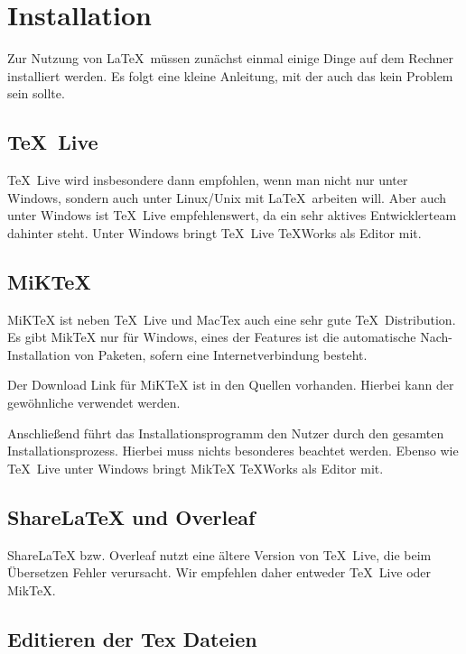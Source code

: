 
\chapter{Installation}\label{ch:installation}

Zur Nutzung von \LaTeX\ müssen zunächst einmal einige Dinge auf dem Rechner installiert werden. 
Es folgt eine kleine Anleitung, mit der auch das kein Problem sein sollte.

\section{\TeX\ Live}

\TeX\ Live wird insbesondere dann empfohlen, wenn man nicht nur unter Windows, sondern auch unter Linux/Unix mit \LaTeX\ arbeiten will. Aber auch unter Windows ist \TeX\ Live empfehlenswert, da ein sehr aktives Entwicklerteam dahinter steht. Unter Windows bringt \TeX\ Live \TeX Works als Editor mit.

\section{MiKTeX}

MiKTeX ist neben \TeX\ Live und MacTex auch eine sehr gute \TeX\ Distribution. Es gibt MikTeX nur für Windows, eines der Features ist die automatische Nach-Installation von Paketen, sofern eine Internetverbindung besteht.

Der Download Link für MiKTeX ist in den Quellen vorhanden. Hierbei kann der gewöhnliche  verwendet werden. 

Anschließend führt das Installationsprogramm den Nutzer durch den gesamten Installationsprozess. Hierbei muss nichts besonderes beachtet werden. Ebenso wie \TeX\ Live unter Windows bringt MikTeX \TeX Works als Editor mit.

\section{ShareLaTeX und Overleaf}

ShareLaTeX bzw. Overleaf nutzt eine ältere Version von \TeX\ Live, die beim Übersetzen Fehler verursacht. Wir empfehlen daher entweder \TeX\ Live oder Mik\TeX.

\section{Editieren der Tex Dateien}

